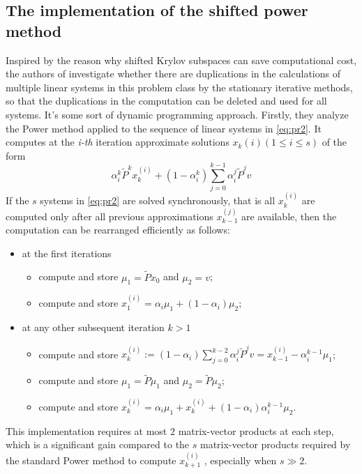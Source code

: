 \documentclass[12pt]{article}
\begin{document}
\subsection{The implementation of the shifted power method}
Inspired by the reason why shifted Krylov subspaces can save computational cost, the authors of \cite{SHEN2022126799} investigate whether there are duplications in the calculations of multiple linear systems in this problem class by the stationary iterative methods, so that the duplications in the computation can be deleted and used for all systems. It's some sort of dynamic programming approach. Firstly, they analyze the Power method applied to the sequence of linear systems in \ref{eq:pr2}. It computes at the \emph{i-th} iteration approximate solutions $x_k (i) (1 \leq i \leq s)$ of the form
\begin{equation}
    \alpha_i^k \tilde P^k x_k^{(i)} + (1 - \alpha_i^k) \sum_{j=0}^{k-1} \alpha_i^j \tilde P^j v
\end{equation}
If the $s$ systems in \ref{eq:pr2} are solved synchronously, that is all $x^{(i)}_k$ are computed only after all previous approximations $x^{(j)}_{k-1}$ are available, then the computation can be rearranged efficiently as follows:
\begin{itemize}
    \item at the first iterations
        \begin{itemize}
            \item compute and store $\mu_1 = \tilde P x_0$ and $\mu_2 = v$;
            \item compute and store $x_1^{(i)} = \alpha_i \mu_1 + (1-\alpha_i)\mu_2;$
        \end{itemize}
    \item at any other subsequent iteration $k>1$
        \begin{itemize}
            \item compute and store $x_k^(i) := (1-\alpha_i)\sum_{j=0}^{k-2} \alpha_i^j \tilde P^j v= x_{k-1}^{(i)} - \alpha_i^{k-1} \mu_1$;
            \item compute and store $\mu_1 = \tilde P \mu_1$ and $\mu_2 = \tilde P \mu_2$;
            \item compute and store $x_k^{(i)} = \alpha_i \mu_1 + x_k^{(i)} + (1-\alpha_i)\alpha^{k-1}_i \mu_2$.
        \end{itemize}
\end{itemize}
This implementation requires at most $2$ matrix-vector products at each step, which is a significant gain compared to the $s$ matrix-vector products required by the standard Power method to compute $x^{(i)}_{k+1}$ , especially when $s \gg 2$. \vspace{0.4cm}
\end{document}
